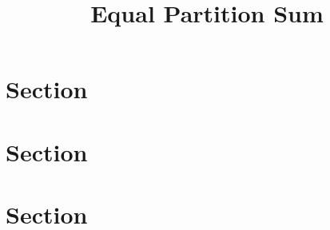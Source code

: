 \documentclass[12pt]{article}
\title{Equal Partition Sum}
\begin{document}
\maketitle
\section{Section}

\section{Section}

\section{Section}
\end{document}
